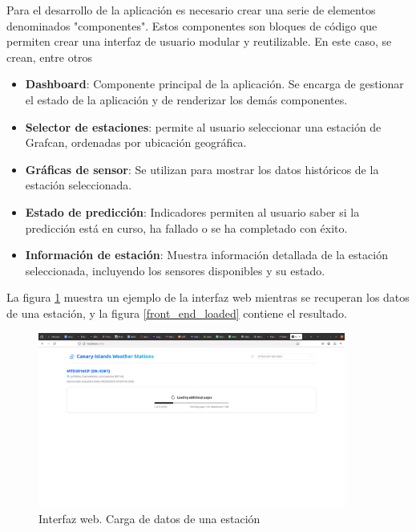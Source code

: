 Para el desarrollo de la aplicación es necesario crear una serie de elementos denominados "componentes". Estos componentes son bloques de código que 
permiten crear una interfaz de usuario modular y reutilizable. En este caso, se crean, entre otros
\begin{itemize}
    \item \textbf{Dashboard}: Componente principal de la aplicación. Se encarga de gestionar el estado de la aplicación y de renderizar los demás componentes.
    \item \textbf{Selector de estaciones}: permite al usuario seleccionar una estación de Grafcan, ordenadas por ubicación geográfica.
    \item \textbf{Gráficas de sensor}: Se utilizan para mostrar los datos históricos de la estación seleccionada. 
    \item \textbf{Estado de predicción}: Indicadores permiten al usuario saber si la predicción está en curso, ha fallado o se ha completado con éxito.
    \item \textbf{Información de estación}: Muestra información detallada de la estación seleccionada, incluyendo los sensores disponibles y su estado.
\end{itemize}

La figura \ref{front_end_loading} muestra un ejemplo de la interfaz web mientras se recuperan los datos de una estación, y la figura 
\ref{front_end_loaded} contiene el resultado.

\begin{figure}[H]
    \centering
    \includegraphics[width=0.9\textwidth]{images/frontend_loading.png}
    \caption{Interfaz web. Carga de datos de una estación}
    \label{front_end_loading}
\end{figure}

